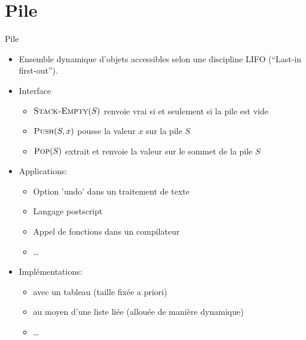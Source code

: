 \section{Pile}

\begin{frame}{Pile}
\begin{itemize}
\item Ensemble dynamique d'objets accessibles selon une discipline
  \alert{LIFO} (``Last-in first-out'').
\item Interface
\begin{itemize}
\item $\textnormal{\scshape Stack-Empty}(S)$ renvoie vrai si et seulement si la pile est vide
\item $\textnormal{\scshape Push}(S,x)$ pousse la valeur $x$ sur la pile $S$
\item $\textnormal{\scshape Pop}(S)$ extrait et renvoie la valeur sur le sommet de la pile $S$
\end{itemize}
\item Applications:
\begin{itemize}
\item Option 'undo' dans un traitement de texte
\item Langage postscript
\item Appel de fonctions dans un compilateur
\item \ldots
\end{itemize}
\item Implémentations:
\begin{itemize}
\item avec un tableau (taille fixée a priori)
\item au moyen d'une liste liée (allouée de manière dynamique)
\item \ldots
\end{itemize}
\end{itemize}
\end{frame}


